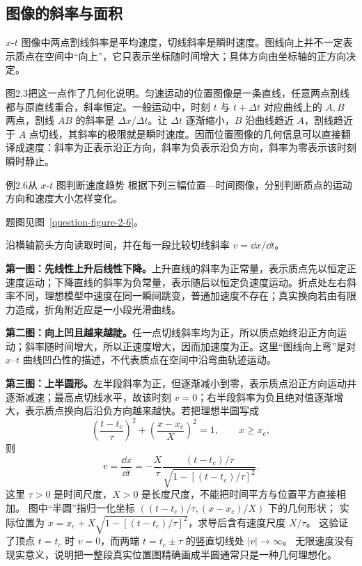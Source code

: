 \subsection{图像的斜率与面积}

\PositionSlopeDiagram

$x$-$t$ 图像中两点割线斜率是平均速度，切线斜率是瞬时速度。图线向上并不一定表示质点在空间中“向上”，它只表示坐标随时间增大；具体方向由坐标轴的正方向决定。

图2.3把这一点作了几何化说明。匀速运动的位置图像是一条直线，任意两点割线都与原直线重合，斜率恒定。一般运动中，时刻 $t$ 与 $t+\Delta t$ 对应曲线上的 $A,B$ 两点，割线 $AB$ 的斜率是 $\Delta x/\Delta t$。让 $\Delta t$ 逐渐缩小，$B$ 沿曲线趋近 $A$，割线趋近于 $A$ 点切线，其斜率的极限就是瞬时速度。因而位置图像的几何信息可以直接翻译成速度：斜率为正表示沿正方向，斜率为负表示沿负方向，斜率为零表示该时刻瞬时静止。

\begin{origexamplebox}{例2.6\quad 从 $x$-$t$ 图判断速度趋势}
根据下列三幅位置—时间图像，分别判断质点的运动方向和速度大小怎样变化。
\par 题图见图~\ref{question-figure-2-6}。
\KQuestionAG
\end{origexamplebox}
\begin{xesolution}
沿横轴箭头方向读取时间，并在每一段比较切线斜率 $v=\dd x/\dd t$。


\ExampleTwoSixGraphs
\textbf{第一图：先线性上升后线性下降。}上升直线的斜率为正常量，表示质点先以恒定正速度运动；下降直线的斜率为负常量，表示随后以恒定负速度运动。折点处左右斜率不同，理想模型中速度在同一瞬间跳变，普通加速度不存在；真实换向若由有限力造成，折角附近应是一小段光滑曲线。

\textbf{第二图：向上凹且越来越陡。}任一点切线斜率均为正，所以质点始终沿正方向运动；斜率随时间增大，所以正速度增大，因而加速度为正。这里“图线向上弯”是对 $x$--$t$ 曲线凹凸性的描述，不代表质点在空间中沿弯曲轨迹运动。

\textbf{第三图：上半圆形。}左半段斜率为正，但逐渐减小到零，表示质点沿正方向运动并逐渐减速；最高点切线水平，故该时刻 $v=0$；右半段斜率为负且绝对值逐渐增大，表示质点换向后沿负方向越来越快。若把理想半圆写成
\[
 \left(\frac{t-t_c}{\tau}\right)^2+
 \left(\frac{x-x_c}{X}\right)^2=1,\qquad x\ge x_c,
\]
则
\[
 v=\frac{\dd x}{\dd t}
   =-\frac X\tau\frac{(t-t_c)/\tau}{\sqrt{1-[(t-t_c)/\tau]^2}}.
\]
这里 $\tau>0$ 是时间尺度，$X>0$ 是长度尺度，不能把时间平方与位置平方直接相加。
图中“半圆”指归一化坐标 $((t-t_c)/\tau,(x-x_c)/X)$ 下的几何形状；
实际位置为 $x=x_c+X\sqrt{1-[(t-t_c)/\tau]^2}$，求导后含有速度尺度 $X/\tau$。
这验证了顶点 $t=t_c$ 时 $v=0$，而两端 $t=t_c\pm\tau$ 的竖直切线处 $|v|\to\infty$。
无限速度没有现实意义，说明把一整段真实位置图精确画成半圆通常只是一种几何理想化。
\end{xesolution}

